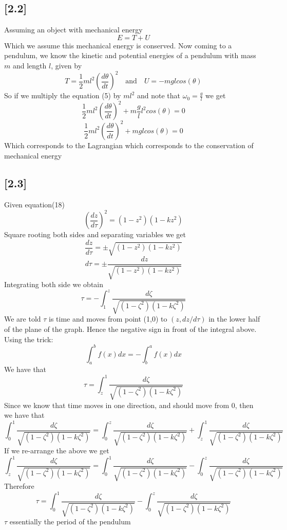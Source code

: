\documentclass{WitsHomework}
\begin{document}
\subsection*{[2.2]}
Assuming an object with mechanical energy 
$$E=T+U$$
Which we assume this mechanical energy is conserved. Now coming to a pendulum, we know the kinetic and potential energies of a pendulum with mass $m$ and length $l$, given by
$$T=\frac{1}{2}ml^2\left(\frac{d\theta}{dt}\right)^2 \quad\text{and}\quad U=-mglcos(\theta)$$
So if we multiply the equation (5) by $ml^2$ and note that $\omega_0=\frac{g}{l}$ we get
$$\frac{1}{2}ml^2\left(\frac{d\theta}{dt}\right)^2+m\frac{g}{l} l^2cos(\theta)=0$$
$$\frac{1}{2}ml^2\left(\frac{d\theta}{dt}\right)^2+mglcos(\theta)=0$$
Which corresponds to the Lagrangian which corresponds to the conservation of mechanical energy
\subsection*{[2.3]}
Given equation(18)
$$\left(\frac{dz}{d\tau}\right)^2=(1-z^2)(1-kz^2)$$
Square rooting both sides and separating variables we get
$$\frac{dz}{d\tau}=\pm \sqrt{(1-z^2)(1-kz^2)}$$
$$d\tau=\pm \frac{dz}{\sqrt{(1-z^2)(1-kz^2)}}$$
Integrating both side we obtain
$$\tau=-\int_{1}^{z} \frac{d\zeta}{\sqrt{(1-\zeta^2)(1-k\zeta^2)}}$$
We are told $\tau$ is time and moves from point (1,0) to $(z,dz/d\tau)$ in the lower half of the plane of the graph. Hence the negative sign in front of the integral above. Using the trick:
$$\int_{a}^{b} f(x)dx=-\int_{b}^{a} f(x)dx$$
We have that
$$\tau=\int_{z}^{1} \frac{d\zeta}{\sqrt{(1-\zeta^2)(1-k\zeta^2)}}$$
Since we know that time moves in one direction, and should move from 0, then we have that
$$\int_{0}^{1} \frac{d\zeta}{\sqrt{(1-\zeta^2)(1-k\zeta^2)}}=\int_{0}^{z} \frac{d\zeta}{\sqrt{(1-\zeta^2)(1-k\zeta^2)}}+\int_{z}^{1} \frac{d\zeta}{\sqrt{(1-\zeta^2)(1-k\zeta^2)}}$$
If we re-arrange the above we get
$$\int_{z}^{1} \frac{d\zeta}{\sqrt{(1-\zeta^2)(1-k\zeta^2)}}=\int_{0}^{1} \frac{d\zeta}{\sqrt{(1-\zeta^2)(1-k\zeta^2)}}-\int_{0}^{z} \frac{d\zeta}{\sqrt{(1-\zeta^2)(1-k\zeta^2)}}$$
Therefore
$$\tau=\int_{0}^{1} \frac{d\zeta}{\sqrt{(1-\zeta^2)(1-k\zeta^2)}}-\int_{0}^{z} \frac{d\zeta}{\sqrt{(1-\zeta^2)(1-k\zeta^2)}}$$
$\tau$ essentially the period of the pendulum
\end{document}
